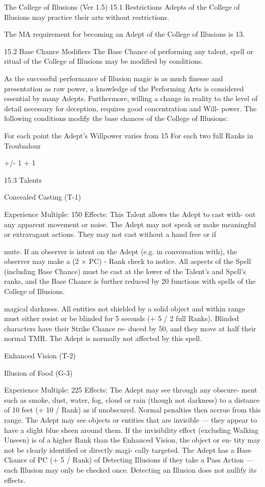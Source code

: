 \begin{Chapter}{The College of Illusions (Ver 1.5)}
15.1 Restrictions 
Adepts  of  the  College  of  Illusions  may  practice 
their arts without restrictions. 

The MA requirement for becoming an Adept of the 
College of Illusions is 13. 

15.2 Base Chance Modifiers 
The Base Chance of performing any talent, spell or 
ritual  of  the  College  of  Illusions  may  be  modified 
by conditions. 

As the successful performance of Illusion magic is 
as  much  finesse  and  presentation  as  raw  power,  a 
knowledge  of  the  Performing  Arts  is  considered 
essential  by  many  Adepts.  Furthermore,  willing  a 
change in reality to the level of detail necessary for 
deception,  requires  good  concentration  and  Will-
power.  The  following  conditions  modify  the  base 
chances of the College of Illusions: 

For each point the Adept’s Willpower 
varies from 15 
For each two full Ranks in Troubadour 

 +/- 
1 
+ 1 

15.3 Talents  

Concealed Casting (T-1) 

Experience Multiple: 150 
Effects: This Talent allows the Adept to cast with-
out  any  apparent  movement  or  noise.  The  Adept 
may not speak or make meaningful or extravagant 
actions. They may not cast without a hand free or if 

mute. If an observer is intent on the Adept (e.g. in 
conversation  with),  the  observer  may  make  a  (2  × 
PC) - Rank check to notice. All aspects of the Spell 
(including Base Chance) must be cast at the lower 
of  the  Talent’s  and  Spell’s  ranks,  and  the  Base 
Chance is further reduced by 20%
functions with spells of the College of Illusions. 

magical  darkness.  All  entities  not  shielded  by  a 
solid  object  and  within  range  must  either  resist  or 
be  blinded  for  5  seconds  (+  5  /  2  full  Ranks). 
Blinded  characters  have  their  Strike  Chance  re-
duced  by  50,  and  they  move  at  half  their  normal 
TMR.  The  Adept  is  normally  not  affected  by  this 
spell. 

Enhanced Vision (T-2) 

Illusion of Food (G-3) 

Experience Multiple: 225 
Effects:  The  Adept  may  see  through  any  obscure-
ment such as smoke, dust, water, fog, cloud or rain 
(though not darkness) to a distance of 10 feet (+ 10 
/  Rank)  as  if  unobscured.  Normal  penalties  then 
accrue from this range. The Adept may see objects 
or entities that are invisible — they appear to have 
a  slight blue  sheen  around  them.  If  the  invisibility 
effect  (excluding  Walking  Unseen)  is  of  a  higher 
Rank  than  the  Enhanced  Vision,  the  object  or  en-
tity may not be clearly identified or directly magi-
cally targeted. The Adept has a Base Chance of PC 
(+  5  /  Rank)  of  Detecting  Illusions  if  they  take  a 
Pass Action — each Illusion may only be checked 
once.  Detecting  an  Illusion  does  not  nullify  its 
effects. 


\end{Chapter}
